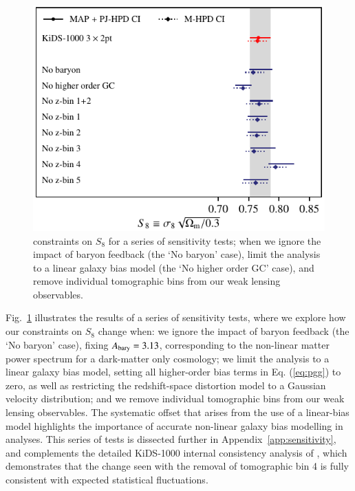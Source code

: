 \begin{figure}
	\begin{center}
		\includegraphics[width=\columnwidth]{Parameter_Plots/systematics/S8_comparison_blindC}
		\caption{\tttp constraints on $S_8$ for a series of sensitivity tests; when we ignore the impact of baryon feedback (the `No baryon' case), limit the analysis to a linear galaxy bias model (the `No higher order GC' case), and remove individual tomographic bins from our weak lensing observables.  
		\label{fig:S8comp_sensitivity}}
	\end{center}
\end{figure}

Fig.~\ref{fig:S8comp_sensitivity} illustrates the results of a series of sensitivity tests, where we explore how our \tttp constraints on $S_8$ change when: 
we ignore the impact of baryon feedback (the `No baryon' case), fixing $A_{\rm bary}=3.13$, corresponding to the non-linear matter power spectrum for a dark-matter only cosmology; 
we limit the analysis to a linear galaxy bias model, setting all higher-order bias terms in Eq. (\ref{eq:pgg}) to zero, as well as restricting the redshift-space distortion model to a Gaussian velocity distribution; 
and we remove individual tomographic bins from our weak lensing observables. 
The systematic offset that arises from the use of a linear-bias model highlights the importance of accurate non-linear galaxy bias modelling in \tttp analyses.     
This series of tests is dissected further in Appendix~\ref{app:sensitivity}, and complements the detailed KiDS-1000 
internal consistency analysis of \citet[][appendix B]{asgari/etal:inprep}, 
which demonstrates that the change seen with the removal of tomographic bin 4 is fully consistent with expected statistical fluctuations.

